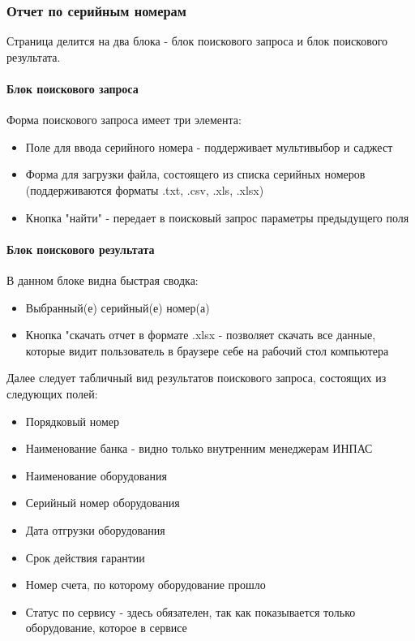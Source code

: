 \documentclass[DIV=calc, paper=a4, fontsize=11pt]{scrartcl} %
\newcommand{\AcceptedFormats}{.txt, .csv, .xls, .xlsx}
\begin{document}
\subsubsection{Отчет по серийным номерам}

Страница делится на два блока - блок поискового запроса и блок поискового результата.
\paragraph{Блок поискового запроса}
Форма поискового запроса имеет три элемента:

\begin{itemize}
	\item Поле для ввода серийного номера  - поддерживает мультивыбор и саджест
	\item Форма для загрузки файла, состоящего из списка серийных номеров (поддерживаются форматы \AcceptedFormats)
	\item Кнопка "найти" - передает в поисковый запрос параметры предыдущего поля
\end{itemize}

\paragraph{Блок поискового результата}
В данном блоке видна быстрая сводка:

\begin{itemize}
	\item Выбранный(е) серийный(е) номер(а)
	\item Кнопка "скачать отчет в формате .xlsx - позволяет скачать все данные, которые видит пользователь в браузере себе на рабочий стол компьютера
\end{itemize}

Далее следует табличный вид результатов поискового запроса, состоящих из следующих полей:

\begin{itemize}
	\item Порядковый номер
	\item Наименование банка - видно только внутренним менеджерам ИНПАС
	\item Наименование оборудования
	\item Серийный номер оборудования
	\item Дата отгрузки оборудования
	\item Срок действия гарантии
	\item Номер счета, по которому оборудование прошло
	\item Статус по сервису - здесь обязателен, так как показывается только оборудование, которое в сервисе
\end{itemize}
\end{document}
